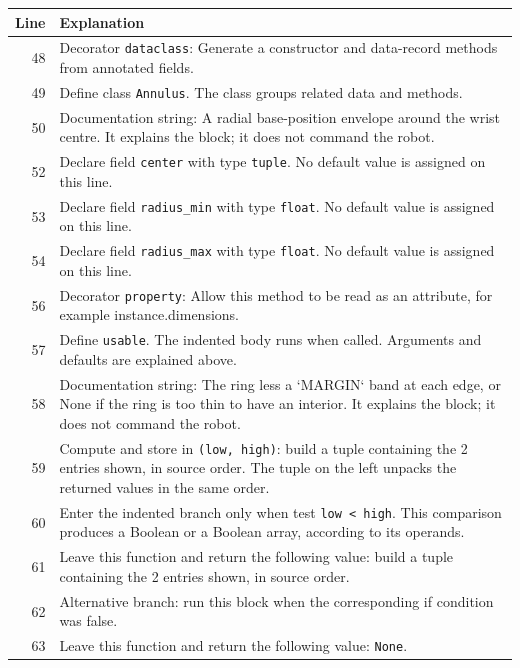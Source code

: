 \documentclass[11pt,a4paper]{book}
\begin{document}
\begin{longtable}{r p{}}

\textbf{Line} & \textbf{Explanation} \\ \hline \endhead

48 & Decorator \texttt{dataclass}: Generate a constructor and data-record methods from annotated fields. \\

49 & Define class \texttt{Annulus}. The class groups related data and methods. \\

50 & Documentation string: A radial base-position envelope around the wrist centre. It explains the block; it does not command the robot. \\

52 & Declare field \texttt{center} with type \texttt{tuple}. No default value is assigned on this line. \\

53 & Declare field \texttt{radius\_min} with type \texttt{float}. No default value is assigned on this line. \\

54 & Declare field \texttt{radius\_max} with type \texttt{float}. No default value is assigned on this line. \\

56 & Decorator \texttt{property}: Allow this method to be read as an attribute, for example instance.dimensions. \\

57 & Define \texttt{usable}. The indented body runs when called. Arguments and defaults are explained above. \\

58 & Documentation string: The ring less a `MARGIN` band at each edge, or None if the ring is too thin to have an interior. It explains the block; it does not command the robot. \\

59 & Compute and store in \texttt{(low, high)}: build a tuple containing the 2 entries shown, in source order. The tuple on the left unpacks the returned values in the same order. \\

60 & Enter the indented branch only when test \texttt{low < high}. This comparison produces a Boolean or a Boolean array, according to its operands. \\

61 & Leave this function and return the following value: build a tuple containing the 2 entries shown, in source order. \\

62 & Alternative branch: run this block when the corresponding if condition was false. \\

63 & Leave this function and return the following value: \texttt{None}. \\

\end{longtable}
\end{document}
